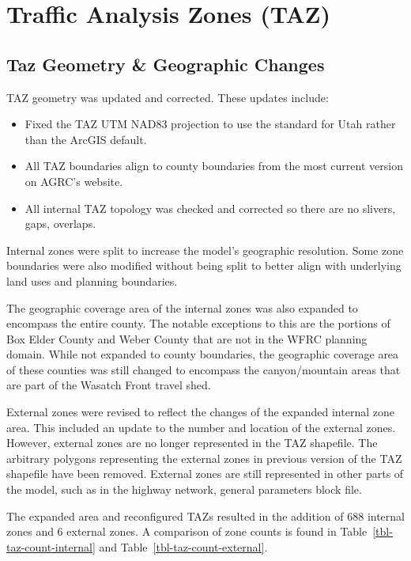 \documentclass[
  letterpaper,
  DIV=11,
  numbers=noendperiod,
  titlepage=false]{scrreprt}
\providecommand{\tightlist}{%
  \setlength{\itemsep}{0pt}\setlength{\parskip}{0pt}}\usepackage{longtable,booktabs,array}
\begin{document}
\hypertarget{traffic-analysis-zones-taz}{%
\section{Traffic Analysis Zones
(TAZ)}\label{traffic-analysis-zones-taz}}

\hypertarget{taz-geometry-geographic-changes}{%
\subsection{Taz Geometry \& Geographic
Changes}\label{taz-geometry-geographic-changes}}

TAZ geometry was updated and corrected. These updates include:

\begin{itemize}
\tightlist
\item
  Fixed the TAZ UTM NAD83 projection to use the standard for Utah rather
  than the ArcGIS default.
\item
  All TAZ boundaries align to county boundaries from the most current
  version on AGRC's website.
\item
  All internal TAZ topology was checked and corrected so there are no
  slivers, gaps, overlaps.
\end{itemize}

Internal zones were split to increase the model's geographic resolution.
Some zone boundaries were also modified without being split to better
align with underlying land uses and planning boundaries.

The geographic coverage area of the internal zones was also expanded to
encompass the entire county. The notable exceptions to this are the
portions of Box Elder County and Weber County that are not in the WFRC
planning domain. While not expanded to county boundaries, the geographic
coverage area of these counties was still changed to encompass the
canyon/mountain areas that are part of the Wasatch Front travel shed.

External zones were revised to reflect the changes of the expanded
internal zone area. This included an update to the number and location
of the external zones. However, external zones are no longer represented
in the TAZ shapefile. The arbitrary polygons representing the external
zones in previous version of the TAZ shapefile have been removed.
External zones are still represented in other parts of the model, such
as in the highway network, general parameters block file.

The expanded area and reconfigured TAZs resulted in the addition of 688
internal zones and 6 external zones. A comparison of zone counts is
found in Table~\ref{tbl-taz-count-internal} and
Table~\ref{tbl-taz-count-external}.
\end{document}

